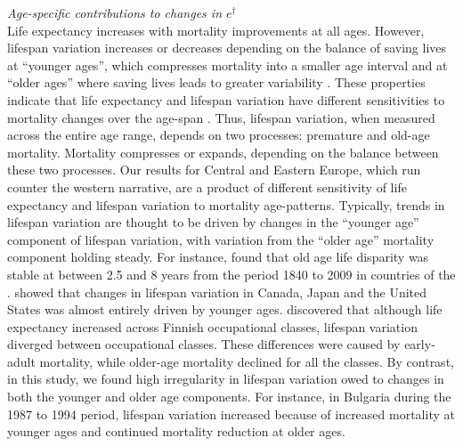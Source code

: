 \documentclass{article}
\begin{document}
\begin{spacing}{1.5}
\emph{Age-specific contributions to changes in $e^\dagger$}\\

Life expectancy increases with mortality improvements at all ages. However, lifespan variation increases or decreases depending on the balance of saving lives at ``younger ages'', which compresses mortality into a smaller age interval and at ``older ages'' where saving lives leads to greater variability \citep{zhang2009, gillespie2014divergence}. These properties indicate that life expectancy and lifespan variation have different sensitivities to mortality changes over the age-span \citep{vanraalte2013}. Thus, lifespan variation, when measured across the entire age range, depends on two processes: premature and old-age mortality. Mortality compresses or expands, depending on the balance between these two processes. Our results for Central and Eastern Europe, which run counter the western narrative, are a product of different sensitivity of life expectancy and lifespan variation to mortality age-patterns.  Typically, trends in lifespan variation are thought to be driven by changes in the ``younger age'' component of lifespan variation, with variation from the ``older age'' mortality component holding steady. For instance, \citet{vaupel2011} found that old age life disparity was stable at between 2.5 and 8 years from the period 1840 to 2009 in countries of the \cite{HMD}. \citet{gillespie2014divergence} showed that changes in lifespan variation in Canada, Japan and the United States was almost entirely driven by younger ages. \citet{vanraalte2014} discovered
that although life expectancy increased across Finnish occupational classes, lifespan variation diverged between occupational classes. These differences were caused by early-adult mortality, while older-age mortality declined for all the classes. By contrast, in this study, we found high irregularity in lifespan variation owed to changes in both the younger and older age components. For instance, in Bulgaria during the 1987 to 1994 period, lifespan variation increased because of increased mortality at younger ages and continued mortality reduction at older ages.\\


\end{spacing}
\end{document}

